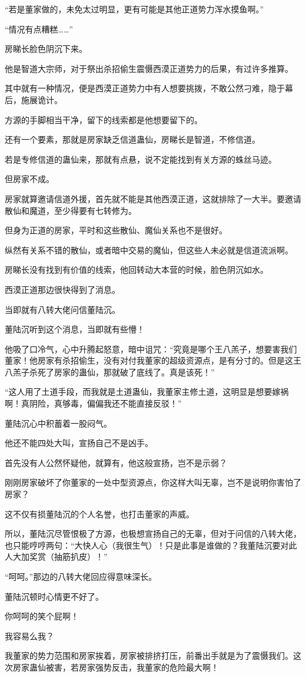 \begin{this_body}
“若是董家做的，未免太过明显，更有可能是其他正道势力浑水摸鱼啊。”

“情况有点糟糕……”

房睇长脸色阴沉下来。

他是智道大宗师，对于祭出杀招偷生震慑西漠正道势力的后果，有过许多推算。

其中就有一种情况，便是西漠正道势力中有人想要挑拨，不敢公然刁难，隐于幕后，施展诡计。

方源的手脚相当干净，留下的线索都是他想要留下的。

还有一个要素，那就是房家缺乏信道蛊仙，房睇长是智道，不修信道。

若是专修信道的蛊仙来，那就有点悬，说不定能找到有关方源的蛛丝马迹。

但房家不成。

房家就算邀请信道外援，首先就不能是其他西漠正道，这就排除了一大半。要邀请散仙和魔道，至少得要有七转修为。

但身为正道的房家，平时和这些散仙、魔仙关系也不是很好。

纵然有关系不错的散仙，或者暗中交易的魔仙，但这些人未必就是信道流派啊。

房睇长没有找到有价值的线索，他回转动大本营的时候，脸色阴沉如水。

西漠正道那边很快得到了消息。

当即就有八转大佬问信董陆沉。

董陆沉听到这个消息，当即就有些懵！

他吸了口冷气，心中升腾起怒意，暗中诅咒：“究竟是哪个王八羔子，想要害我们董家！他房家有杀招偷生，没有对付我董家的超级资源点，是有分寸的。但是这王八羔子杀死了房家的蛊仙，那就破了底线了。真是该死！”

“这人用了土道手段，而我就是土道蛊仙，我董家主修土道，这明显是想要嫁祸啊！真阴险，真够毒，偏偏我还不能直接反驳！”

董陆沉心中积蓄着一股闷气。

他还不能四处大叫，宣扬自己不是凶手。

首先没有人公然怀疑他，就算有，他这般宣扬，岂不是示弱？

刚刚房家破坏了你董家的一处中型资源点，你这样大叫无辜，岂不是说明你害怕了房家？

这不仅有损董陆沉的个人名誉，也打击董家的声威。

所以，董陆沉尽管恨极了方源，也极想宣扬自己的无辜，但对于问信的八转大佬，也只能哼哼两句：“大快人心（我很生气）！只是此事是谁做的？我董陆沉要对此人大加奖赏（抽筋扒皮）！”

“呵呵。”那边的八转大佬回应得意味深长。

董陆沉顿时心情更不好了。

你呵呵的笑个屁啊！

我容易么我？

我董家的势力范围和房家挨着，房家被排挤打压，前番出手就是为了震慑我们。这次房家蛊仙被害，若房家强势反击，我董家的危险最大啊！

\end{this_body}

